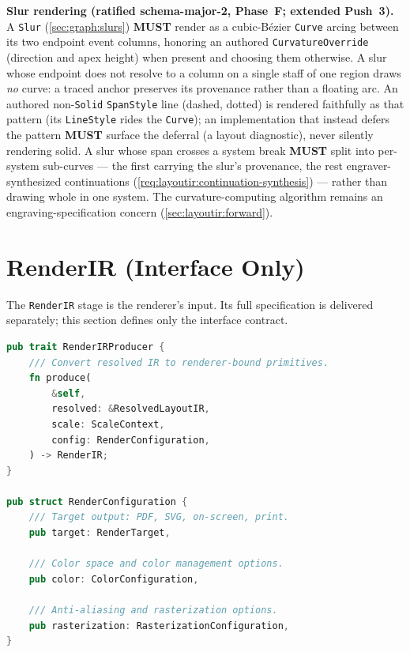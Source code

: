 \documentclass[11pt,letterpaper]{report}
\newcounter{requirement}[chapter]
\newcommand{\MUST}{\textbf{MUST}}
\begin{document}
\begin{requirement}
  \label{req:layoutir:slur-curve}
  \textbf{Slur rendering (ratified schema-major-2, Phase~F; extended
  Push~3).} A \texttt{Slur} (\ref{sec:graph:slurs}) \MUST{} render
  as a cubic-B\'ezier \texttt{Curve} arcing between its two endpoint
  event columns, honoring an authored \texttt{CurvatureOverride}
  (direction and apex height) when present and choosing them
  otherwise. A slur whose endpoint does not resolve to a column on a
  single staff of one region draws \emph{no} curve: a traced anchor
  preserves its provenance rather than a floating arc. An authored
  non-\texttt{Solid} \texttt{SpanStyle} line (dashed, dotted) is
  rendered faithfully as that pattern (its \texttt{LineStyle} rides
  the \texttt{Curve}); an implementation that instead defers the
  pattern \MUST{} surface the deferral (a layout diagnostic), never
  silently rendering solid. A slur whose span crosses a system break
  \MUST{} split into per-system sub-curves --- the first carrying the
  slur's provenance, the rest engraver-synthesized continuations
  (\ref{req:layoutir:continuation-synthesis}) --- rather than drawing
  whole in one system. The curvature-computing algorithm remains an
  engraving-specification concern (\ref{sec:layoutir:forward}).
\end{requirement}

\section{RenderIR (Interface Only)}
\label{sec:layoutir:render}

The \texttt{RenderIR} stage is the renderer's input. Its full
specification is delivered separately; this section defines only the
interface contract.

\begin{lstlisting}[language=Rust]
pub trait RenderIRProducer {
    /// Convert resolved IR to renderer-bound primitives.
    fn produce(
        &self,
        resolved: &ResolvedLayoutIR,
        scale: ScaleContext,
        config: RenderConfiguration,
    ) -> RenderIR;
}

pub struct RenderConfiguration {
    /// Target output: PDF, SVG, on-screen, print.
    pub target: RenderTarget,

    /// Color space and color management options.
    pub color: ColorConfiguration,

    /// Anti-aliasing and rasterization options.
    pub rasterization: RasterizationConfiguration,
}
\end{lstlisting}
\end{document}
